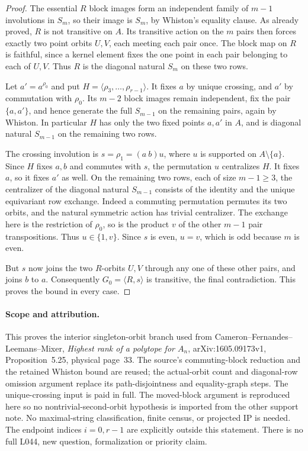\documentclass[11pt,a4paper]{article}
\newcommand{\gen}[1]{\langle#1\rangle}
\begin{document}
\begin{proof}
The essential $R$ block images form an independent family of
$m-1$ involutions in $S_m$, so their image is $S_m$, by
Whiston's equality clause. As already proved, $R$ is not
transitive on $A$. Its transitive action on the $m$ pairs then
forces exactly two point orbits $U,V$, each meeting each pair
once. The block map on $R$ is faithful, since a kernel element
fixes the one point in each pair belonging to each of $U,V$.
Thus $R$ is the diagonal natural $S_m$ on these two rows.

Let $a'=a^{\rho_0}$ and put $H=\gen{\rho_3,\ldots,\rho_{r-1}}$.
It fixes $a$ by unique crossing, and $a'$ by commutation with
$\rho_0$. Its $m-2$ block images remain independent, fix the
pair $\{a,a'\}$, and hence generate the full $S_{m-1}$ on the
remaining pairs, again by Whiston. In particular $H$ has only
the two fixed points $a,a'$ in $A$, and is diagonal natural
$S_{m-1}$ on the remaining two rows.

The crossing involution is $s=\rho_1=(a\ b)u$, where $u$ is
supported on $A\setminus\{a\}$. Since $H$ fixes $a,b$ and
commutes with $s$, the permutation $u$ centralizes $H$.
It fixes $a$, so it fixes $a'$ as well. On the remaining two
rows, each of size $m-1\geq3$, the centralizer of the diagonal
natural $S_{m-1}$ consists of the identity and the unique
equivariant row exchange. Indeed a commuting permutation
permutes its two orbits, and the natural symmetric action
has trivial centralizer. The exchange here is the restriction
of $\rho_0$, so is the product $v$ of the other $m-1$ pair
transpositions. Thus $u\in\{1,v\}$. Since $s$ is even,
$u=v$, which is odd because $m$ is even.

But $s$ now joins the two $R$-orbits $U,V$ through any one of
these other pairs, and joins $b$ to $a$. Consequently
$G_0=\gen{R,s}$ is transitive, the final contradiction.
This proves the bound in every case.
\end{proof}

\paragraph{Scope and attribution.}
This proves the interior singleton-orbit branch used from
Cameron--Fernandes--Leemans--Mixer, \emph{Highest rank of a
polytope for $A_n$}, arXiv:1605.09173v1, Proposition~5.25,
physical page~33. The source's commuting-block reduction and
the retained Whiston bound are reused; the actual-orbit count
and diagonal-row omission argument replace its path-disjointness
and equality-graph steps. The unique-crossing input is paid
in full. The moved-block argument is reproduced here so no
nontrivial-second-orbit hypothesis is imported from the other
support note. No maximal-string classification, finite census,
or projected IP is needed. The endpoint indices $i=0,r-1$
are explicitly outside this statement. There is no full L044,
new question, formalization or priority claim.
\end{document}
